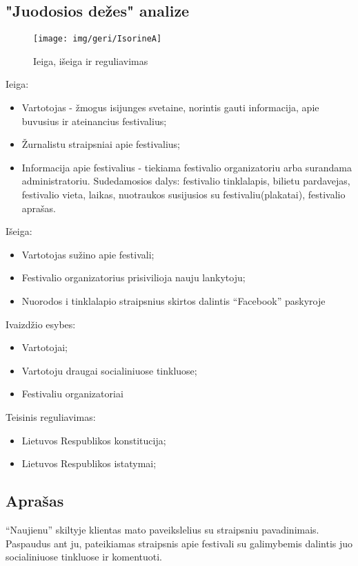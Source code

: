 ﻿\documentclass{VUMIFPSkursinis}
\begin{document}
\subsection{"Juodosios dežes" analize}
\begin{figure}[H]
    \centering
    \texttt{[image: img/geri/IsorineA]}
    \label{img:uml0}
	\caption{Ieiga, išeiga ir reguliavimas}
\end{figure}
\noindent
Ieiga:
\begin{itemize}
\item Vartotojas - žmogus isijunges svetaine, norintis gauti informacija, apie buvusius ir ateinancius festivalius;
\item Žurnalistu straipsniai apie festivalius;
\item Informacija apie festivalius - tiekiama festivalio organizatoriu arba surandama administratoriu. Sudedamosios dalys: festivalio tinklalapis, bilietu pardavejas, festivalio vieta, laikas, nuotraukos susijusios su festivaliu(plakatai), festivalio aprašas.
\end{itemize}
Išeiga:
\begin{itemize}
\item Vartotojas sužino apie festivali;
\item Festivalio organizatorius prisivilioja nauju lankytoju;
\item Nuorodos i tinklalapio straipsnius skirtos dalintis “Facebook” paskyroje
\end{itemize}
Ivaizdžio esybes:
\begin{itemize}
\item Vartotojai;
\item Vartotoju draugai socialiniuose tinkluose;
\item Festivaliu organizatoriai
\end{itemize}
Teisinis reguliavimas:
\begin{itemize}
\item Lietuvos Respublikos konstitucija;
\item Lietuvos Respublikos istatymai;
\end{itemize}
\subsection{Aprašas}



“Naujienu” skiltyje klientas mato paveikslelius su straipsniu pavadinimais.
Paspaudus ant ju, pateikiamas straipsnis apie festivali su galimybemis dalintis juo socialiniuose tinkluose ir komentuoti. 
\end{document}
